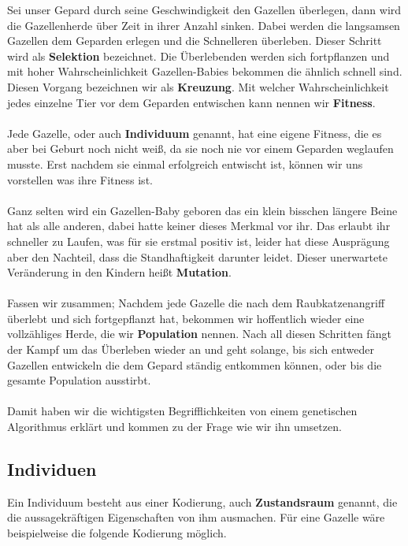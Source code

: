         \noindent
        Sei unser Gepard durch seine Geschwindigkeit den Gazellen überlegen, dann wird die Gazellenherde über Zeit in ihrer Anzahl sinken. Dabei werden die langsamsen Gazellen dem Geparden erlegen und die Schnelleren überleben. Dieser Schritt wird als \textbf{Selektion} bezeichnet. Die Überlebenden werden sich fortpflanzen und mit hoher Wahrscheinlichkeit Gazellen-Babies bekommen die ähnlich schnell sind. Diesen Vorgang bezeichnen wir als \textbf{Kreuzung}. Mit welcher Wahrscheinlichkeit jedes einzelne Tier vor dem Geparden entwischen kann nennen wir \textbf{Fitness}.\\
        \\
        Jede Gazelle, oder auch \textbf{Individuum} genannt, hat eine eigene Fitness, die es aber bei Geburt noch nicht weiß, da sie noch nie vor einem Geparden weglaufen musste. Erst nachdem sie einmal erfolgreich entwischt ist, können wir uns vorstellen was ihre Fitness ist.\\
        \\
        Ganz selten wird ein Gazellen-Baby geboren das ein klein bisschen längere Beine hat als alle anderen, dabei hatte keiner dieses Merkmal vor ihr. Das erlaubt ihr schneller zu Laufen, was für sie erstmal positiv ist, leider hat diese Ausprägung aber den Nachteil, dass die Standhaftigkeit darunter leidet. Dieser unerwartete Veränderung in den Kindern heißt \textbf{Mutation}.\\
        \\
        Fassen wir zusammen; Nachdem jede Gazelle die nach dem Raubkatzenangriff überlebt und sich fortgepflanzt hat, bekommen wir hoffentlich wieder eine vollzähliges Herde, die wir \textbf{Population} nennen. Nach all diesen Schritten fängt der Kampf um das Überleben wieder an und geht solange, bis sich entweder Gazellen entwickeln die dem Gepard ständig entkommen können, oder bis die gesamte Population ausstirbt.\\
        \\
        Damit haben wir die wichtigsten Begrifflichkeiten von einem genetischen Algorithmus erklärt und kommen zu der Frage wie wir ihn umsetzen.

        \subsection{Individuen}

            Ein Individuum besteht aus einer Kodierung, auch \textbf{Zustandsraum} genannt, die die aussagekräftigen Eigenschaften von ihm ausmachen. Für eine Gazelle wäre beispielweise die folgende Kodierung möglich.


